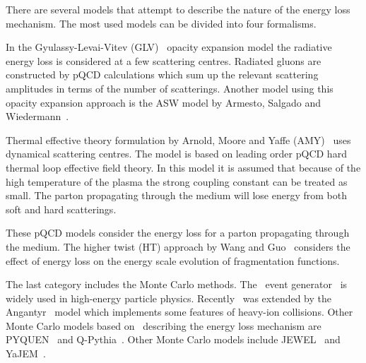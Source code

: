 There are several models that attempt to describe the nature of the energy loss mechanism. The most used models can be divided into four formalisms.
%

In the Gyulassy-Levai-Vitev (GLV)~\cite{Gyulassy:1999zd} opacity expansion model the radiative energy loss is considered at a few scattering centres. Radiated gluons are constructed by pQCD calculations which sum up the relevant scattering amplitudes in terms of the number of scatterings. Another model using this opacity expansion approach is the ASW model by Armesto, Salgado and Wiedermann~\cite{Wiedemann:2000za}.

Thermal effective theory formulation by Arnold, Moore and Yaffe (AMY)~\cite{Arnold:2001ms} uses dynamical scattering centres. The model is based on leading order pQCD hard thermal loop effective field theory. In this model it is assumed that because of the high temperature of the plasma the strong coupling constant can be treated as small. The parton propagating through the medium will lose energy from both soft and hard scatterings.

These pQCD models consider the energy loss for a parton propagating through the medium. The higher twist (HT) approach by Wang and Guo~\cite{Wang:2001ifa} considers the effect of energy loss on the energy scale evolution of fragmentation functions.

The last category includes the Monte Carlo methods. The \pythia~event generator~\cite{pythia} is widely used in high-energy particle physics. Recently \pythia~was extended by the Angantyr~\cite{Bierlich:2018xfw} model which implements some features of heavy-ion collisions. Other Monte Carlo models based on \pythia~describing the energy loss mechanism are PYQUEN~\cite{Lokhtin:2005px} and Q-Pythia~\cite{Armesto:2009zc}. Other Monte Carlo models include JEWEL~\cite{Zapp:2008gi} and YaJEM~\cite{Renk:2009nz}. 





